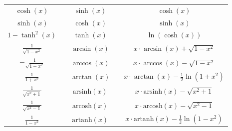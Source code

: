 \begin{center}
\begin{tabular}{| c c c c c |}
        \hline
        $\cosh(x)$                                        &  & $\sinh(x)$                    &  & $\cosh(x)$                            \\
        $\sinh(x)$                                        &  & $\cosh(x)$                    &  & $\sinh(x)$                            \\
        $1 - \tanh^2(x)$                                  &  & $\tanh(x)$                    &  & $\ln(\cosh(x))$                       \\
        \hline
        $\frac{1}{\sqrt{1 - x^2}}$                        &  & $\arcsin(x)$                  &  & $x \cdot \arcsin(x) + \sqrt{1- x^2 }$ \\
        $- \frac{1}{\sqrt{1 - x^2}}$                      &  & $\arccos(x)$                  &  & $x \cdot \arccos(x) - \sqrt{1- x^2 }$ \\
        $\frac{1}{1 + x^2}$                               &  & $\arctan(x)$                  &  & $x \cdot \arctan(x) - \frac{1}{2} \ln(1 + x^2) $ \\
        \hline
        $\frac{1}{\sqrt{x^2 + 1}}$                        &  & $\mathrm{arsinh}(x)$          &  & $x \cdot \mathrm{arsinh}(x) - \sqrt{x^2 +1 } $ \\
        $\frac{1}{\sqrt{x^2 - 1}}$                        &  & $\mathrm{arcosh}(x)$          &  & $x \cdot \mathrm{arcosh}(x) - \sqrt{x^2 - 1} $ \\	
        $\frac{1}{1- x^2}$                                &  & $\mathrm{artanh}(x)$          &  & $x \cdot \mathrm{artanh}(x) - \frac{1}{2} \ln(1-x^2) $ \\
        \hline
    \end{tabular}
\end{center}

\renewcommand{\arraystretch}{1}
\pagebreak